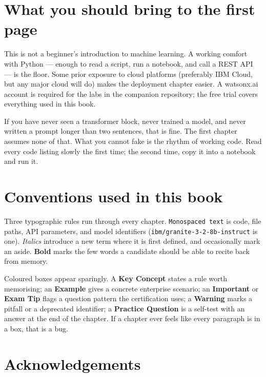\section*{What you should bring to the first page}

This is not a beginner's introduction to machine learning. A working comfort with Python --- enough to read a script, run a notebook, and call a REST API --- is the floor. Some prior exposure to cloud platforms (preferably IBM Cloud, but any major cloud will do) makes the deployment chapter easier. A watsonx.ai account is required for the labs in the companion repository; the free trial covers everything used in this book.

If you have never seen a transformer block, never trained a model, and never written a prompt longer than two sentences, that is fine. The first chapter assumes none of that. What you cannot fake is the rhythm of working code. Read every code listing slowly the first time; the second time, copy it into a notebook and run it.

\section*{Conventions used in this book}

Three typographic rules run through every chapter. \texttt{Monospaced text} is code, file paths, API parameters, and model identifiers (\texttt{ibm/granite-3-2-8b-instruct} is one). \emph{Italics} introduce a new term where it is first defined, and occasionally mark an aside. \textbf{Bold} marks the few words a candidate should be able to recite back from memory.

Coloured boxes appear sparingly. A \textcolor{ibmsuccess}{\textbf{Key Concept}} states a rule worth memorising; an \textcolor{ibmblue}{\textbf{Example}} gives a concrete enterprise scenario; an \textcolor{ibmwarning}{\textbf{Important}} or \textcolor{ibmwarning}{\textbf{Exam Tip}} flags a question pattern the certification uses; a \textcolor{ibmerror}{\textbf{Warning}} marks a pitfall or a deprecated identifier; a \textcolor{ibmgray}{\textbf{Practice Question}} is a self-test with an answer at the end of the chapter. If a chapter ever feels like every paragraph is in a box, that is a bug.

\section*{Acknowledgements}

